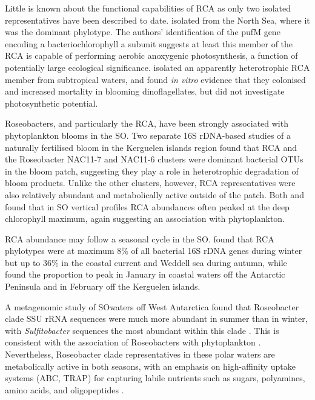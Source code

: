 Little is known about the functional capabilities of \ac{RCA} as only two isolated representatives have been described to date.
\citep{Giebel:2010bsa} isolated  from the North Sea, where it was the dominant phylotype.
The authors' identification of the pufM gene encoding a bacteriochlorophyll a subunit suggests at least this member of the \ac{RCA} is capable of performing aerobic anoxygenic photosynthesis, a function of potentially large ecological significance.
\citep{Mayali:2008eb} isolated an apparently heterotrophic \ac{RCA} member from subtropical waters, and found \emph{in vitro} evidence that they colonised and increased mortality in blooming dinoflagellates, but did not investigate photosynthetic potential.

Roseobacters, and particularly the \ac{RCA}, have been strongly associated with phytoplankton blooms in the \ac{SO}.
Two separate 16S rDNA-based studies of a naturally fertilised bloom in the Kerguelen islands region \cite{West:2008kc,Obernosterer:2011df} found that \ac{RCA} and the Roseobacter NAC11-7 and NAC11-6 clusters were dominant bacterial \acp{OTU} in the bloom patch, suggesting they play a role in heterotrophic degradation of bloom products.
Unlike the other clusters, however, \ac{RCA} representatives were also relatively abundant and metabolically active outside of the patch.
Both \citep{Giebel:2009hr} and \citep{Obernosterer:2011df} found that in \ac{SO} vertical profiles \ac{RCA} abundances often peaked at the deep chlorophyll maximum, again suggesting an association with phytoplankton.

\ac{RCA} abundance may follow a seasonal cycle in the \ac{SO}.
\citep{Giebel:2009hr} found that \ac{RCA} phylotypes were at maximum 8\% of all bacterial 16S rDNA genes during winter but up to 36\% in the coastal current and Weddell sea during autumn, while \citep{Ghiglione:2011ee} found the proportion to peak in January in coastal waters off the Antarctic Peninsula and in February off the Kerguelen islands. 

A metagenomic study of \ac{SO}waters off West Antarctica found that Roseobacter clade \ac{SSU} rRNA sequences were much more abundant in summer than in winter, with \emph{Sulfitobacter} sequences the most abundant within this clade \cite{Grzymski:2012ej}.
This is consistent with the association of Roseobacters with phytoplankton \cite{Moran:2003cwa}.
Nevertheless, Roseobacter clade representatives in these polar waters are metabolically active in both seasons, with an emphasis on high-affinity uptake systems (ABC, TRAP) for capturing labile nutrients such as sugars, polyamines, amino acids, and oligopeptides \cite{Williams:2012bs}.

